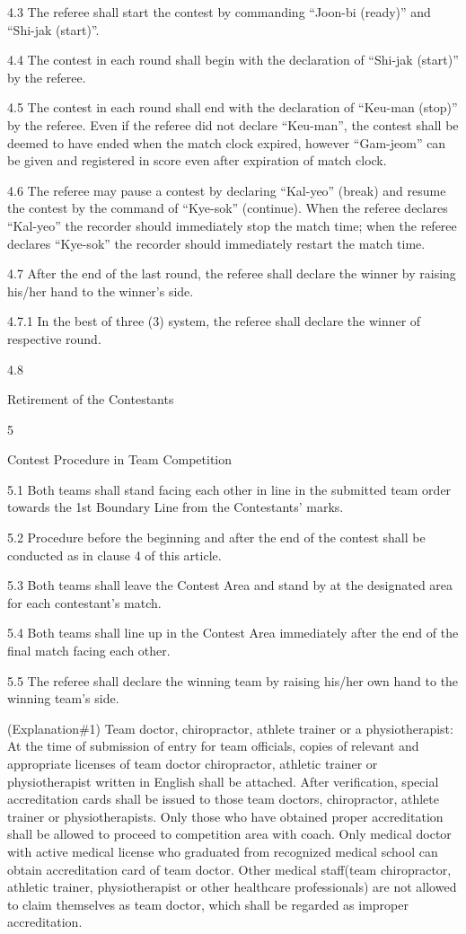 \documentclass[
]{report}
\begin{document}
4.3 The referee shall start the contest by commanding ``Joon-bi
(ready)'' and ``Shi-jak (start)''.

4.4 The contest in each round shall begin with the declaration of
``Shi-jak (start)'' by the referee.

4.5 The contest in each round shall end with the declaration of
``Keu-man (stop)'' by the referee. Even if the referee did not declare
``Keu-man'', the contest shall be deemed to have ended when the match
clock expired, however ``Gam-jeom'' can be given and registered in score
even after expiration of match clock.

4.6 The referee may pause a contest by declaring ``Kal-yeo'' (break) and
resume the contest by the command of ``Kye-sok'' (continue). When the
referee declares ``Kal-yeo'' the recorder should immediately stop the
match time; when the referee declares ``Kye-sok'' the recorder should
immediately restart the match time.

4.7 After the end of the last round, the referee shall declare the
winner by raising his/her hand to the winner's side.

4.7.1 In the best of three (3) system, the referee shall declare the
winner of respective round.

4.8

Retirement of the Contestants

5

Contest Procedure in Team Competition

5.1 Both teams shall stand facing each other in line in the submitted
team order towards the 1st Boundary Line from the Contestants' marks.

5.2 Procedure before the beginning and after the end of the contest
shall be conducted as in clause 4 of this article.

5.3 Both teams shall leave the Contest Area and stand by at the
designated area for each contestant's match.

5.4 Both teams shall line up in the Contest Area immediately after the
end of the final match facing each other.

5.5 The referee shall declare the winning team by raising his/her own
hand to the winning team's side.

(Explanation\#1) Team doctor, chiropractor, athlete trainer or a
physiotherapist: At the time of submission of entry for team officials,
copies of relevant and appropriate licenses of team doctor chiropractor,
athletic trainer or physiotherapist written in English shall be
attached. After verification, special accreditation cards shall be
issued to those team doctors, chiropractor, athlete trainer or
physiotherapists. Only those who have obtained proper accreditation
shall be allowed to proceed to competition area with coach. Only medical
doctor with active medical license who graduated from recognized medical
school can obtain accreditation card of team doctor. Other medical
staff(team chiropractor, athletic trainer, physiotherapist or other
healthcare professionals) are not allowed to claim themselves as team
doctor, which shall be regarded as improper accreditation.
\end{document}
